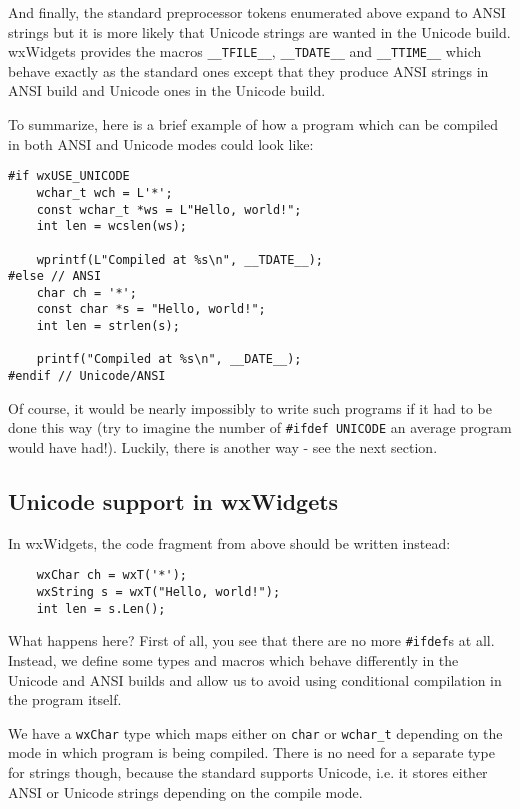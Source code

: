 And finally, the standard preprocessor tokens enumerated above expand to ANSI
strings but it is more likely that Unicode strings are wanted in the Unicode
build. wxWidgets provides the macros {\tt \_\_TFILE\_\_}, {\tt \_\_TDATE\_\_} 
and {\tt \_\_TTIME\_\_} which behave exactly as the standard ones except that
they produce ANSI strings in ANSI build and Unicode ones in the Unicode build.

To summarize, here is a brief example of how a program which can be compiled
in both ANSI and Unicode modes could look like:

\begin{verbatim}
#if wxUSE_UNICODE
    wchar_t wch = L'*';
    const wchar_t *ws = L"Hello, world!";
    int len = wcslen(ws);

    wprintf(L"Compiled at %s\n", __TDATE__);
#else // ANSI
    char ch = '*';
    const char *s = "Hello, world!";
    int len = strlen(s);

    printf("Compiled at %s\n", __DATE__);
#endif // Unicode/ANSI
\end{verbatim}

Of course, it would be nearly impossibly to write such programs if it had to
be done this way (try to imagine the number of {\tt \#ifdef UNICODE} an average
program would have had!). Luckily, there is another way - see the next
section.

\subsection{Unicode support in wxWidgets}\label{unicodeinsidewxw}

In wxWidgets, the code fragment from above should be written instead:

\begin{verbatim}
    wxChar ch = wxT('*');
    wxString s = wxT("Hello, world!");
    int len = s.Len();
\end{verbatim}

What happens here? First of all, you see that there are no more {\tt \#ifdef}s
at all. Instead, we define some types and macros which behave differently in
the Unicode and ANSI builds and allow us to avoid using conditional
compilation in the program itself.

We have a {\tt wxChar} type which maps either on {\tt char} or {\tt wchar\_t} 
depending on the mode in which program is being compiled. There is no need for
a separate type for strings though, because the standard 
 supports Unicode, i.e. it stores either ANSI or
Unicode strings depending on the compile mode.


